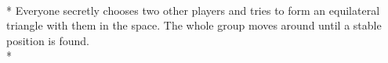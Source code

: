 \begin{minipage}{\textwidth}
\\*
Everyone secretly chooses two other players and tries to form an equilateral triangle with them in the space.  The whole group moves around until a stable position is found.\\*
\end{minipage}    \vfill
